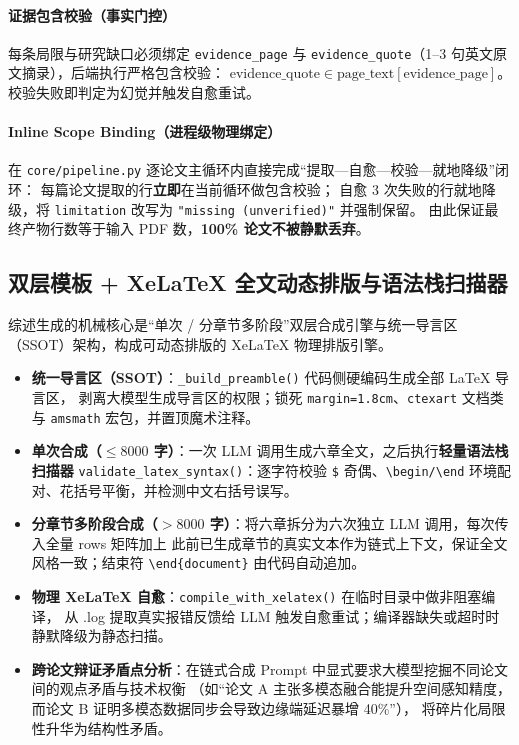 \documentclass[a4paper,11pt]{article}
\begin{document}
\paragraph{证据包含校验（事实门控）} 每条局限与研究缺口必须绑定 \texttt{evidence\_page} 与
\texttt{evidence\_quote}（1--3 句英文原文摘录），后端执行严格包含校验：
$\text{evidence\_quote} \in \text{page\_text}[\text{evidence\_page}]$。
校验失败即判定为幻觉并触发自愈重试。

\paragraph{Inline Scope Binding（进程级物理绑定）} 在 \texttt{core/pipeline.py} 逐论文主循环内直接完成``提取—自愈—校验—就地降级''闭环：
每篇论文提取的行\textbf{立即}在当前循环做包含校验；
自愈 3 次失败的行就地降级，将 \texttt{limitation} 改写为 \texttt{"missing (unverified)"} 并强制保留。
由此保证最终产物行数等于输入 PDF 数，\textbf{100\% 论文不被静默丢弃}。

\subsection{双层模板 + XeLaTeX 全文动态排版与语法栈扫描器}
综述生成的机械核心是``单次 / 分章节多阶段''双层合成引擎与统一导言区（SSOT）架构，构成可动态排版的 XeLaTeX 物理排版引擎。

\begin{itemize}
  \item \textbf{统一导言区（SSOT）}：\texttt{\_build\_preamble()} 代码侧硬编码生成全部 LaTeX 导言区，
        剥离大模型生成导言区的权限；锁死 \texttt{margin=1.8cm}、\texttt{ctexart} 文档类与 \texttt{amsmath} 宏包，并置顶魔术注释。
  \item \textbf{单次合成（$\le 8000$ 字）}：一次 LLM 调用生成六章全文，之后执行\textbf{轻量语法栈扫描器}
        \texttt{validate\_latex\_syntax()}：逐字符校验 \texttt{\$} 奇偶、\texttt{\textbackslash begin/\textbackslash end}
        环境配对、花括号平衡，并检测中文右括号误写。
  \item \textbf{分章节多阶段合成（$>8000$ 字）}：将六章拆分为六次独立 LLM 调用，每次传入全量 rows 矩阵加上
        此前已生成章节的真实文本作为链式上下文，保证全文风格一致；结束符 \texttt{\textbackslash end\{document\}} 由代码自动追加。
  \item \textbf{物理 XeLaTeX 自愈}：\texttt{compile\_with\_xelatex()} 在临时目录中做非阻塞编译，
        从 .log 提取真实报错反馈给 LLM 触发自愈重试；编译器缺失或超时时静默降级为静态扫描。
  \item \textbf{跨论文辩证矛盾点分析}：在链式合成 Prompt 中显式要求大模型挖掘不同论文间的观点矛盾与技术权衡
        （如``论文 A 主张多模态融合能提升空间感知精度，而论文 B 证明多模态数据同步会导致边缘端延迟暴增 40\%''），
        将碎片化局限性升华为结构性矛盾。
\end{itemize}
\end{document}
